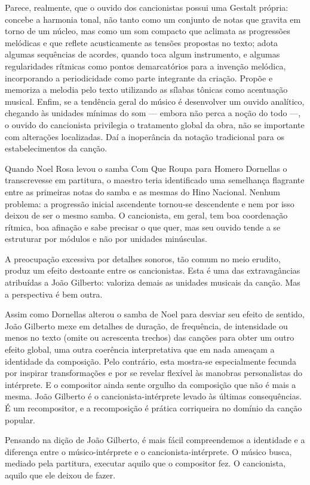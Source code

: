 Parece, realmente, que o ouvido dos cancionistas possui uma Gestalt
própria: concebe a harmonia tonal, não tanto como um conjunto de notas
que gravita em torno de um núcleo, mas como um som compacto que aclimata
as progressões melódicas e que reflete acusticamente as tensões
propostas no texto; adota algumas sequências de acordes, quando toca
algum instrumento, e algumas regularidades rítmicas como pontos
demarcatórios para a invenção melódica, incorporando a periodicidade
como parte integrante da criação. Propõe e memoriza a melodia pelo texto
utilizando as sílabas tônicas como acentuação musical. Enfim, se a
tendência geral do músico é desenvolver um ouvido analítico, chegando às
unidades mínimas do som --- embora não perca a noção do todo ---, o ouvido do
cancionista privilegia o tratamento global da obra, não se importante
com alterações localizadas. Daí a inoperância da notação tradicional
para os estabelecimentos da canção.

Quando Noel Rosa levou o samba Com Que Roupa para Homero Dornellas o
transcrevesse em partitura, o maestro teria identificado uma semelhança
flagrante entre as primeiras notas do samba e as mesmas do Hino
Nacional. Nenhum problema: a progressão inicial ascendente tornou-se
descendente e nem por isso deixou de ser o mesmo samba. O cancionista,
em geral, tem boa coordenação rítmica, boa afinação e sabe precisar o
que quer, mas seu ouvido tende a se estruturar por módulos e não por
unidades minúsculas.

A preocupação excessiva por detalhes sonoros, tão comum no meio erudito,
produz um efeito destoante entre os cancionistas. Esta é uma das
extravagâncias atribuídas a João Gilberto: valoriza demais as unidades
musicais da canção. Mas a perspectiva é bem outra.

Assim como Dornellas alterou o samba de Noel para desviar seu efeito de
sentido, João Gilberto mexe em detalhes de duração, de frequência, de
intensidade ou menos no texto (omite ou acrescenta trechos) das canções
para obter um outro efeito global, uma outra coerência interpretativa
que em nada ameaçam a identidade da composição. Pelo contrário, esta
mostra-se especialmente fecunda por inspirar transformações e por se
revelar flexível às manobras personalistas do intérprete. E o compositor
ainda sente orgulho da composição que não é mais a mesma. João Gilberto
é o cancionista-intérprete levado às últimas consequências. É um
recompositor, e a recomposição é prática corriqueira no domínio da
canção popular.

Pensando na dição de João Gilberto, é mais fácil compreendemos a
identidade e a diferença entre o músico-intérprete e o
cancionista-intérprete. O músico busca, mediado pela partitura, executar
aquilo que o compositor fez. O cancionista, aquilo que ele deixou de
fazer.

